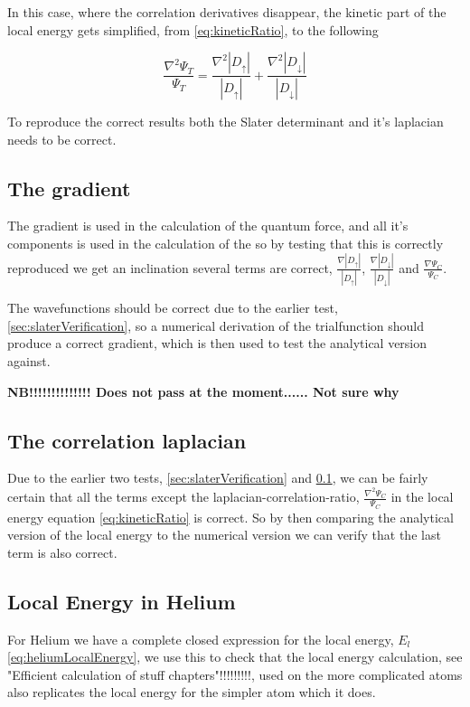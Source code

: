 			In this case, where the correlation derivatives disappear, the kinetic part of the local energy gets simplified, from \eqref{eq:kineticRatio}, to the following

			\[\frac{\nabla^2 \Psi_T}{\Psi_T} = \frac{\nabla^2 |D_\uparrow|}{|D_\uparrow|} + \frac{\nabla^2 |D_\downarrow|}{|D_\downarrow|}  \]

			To reproduce the correct results both the Slater determinant and it's laplacian needs to be correct.

		\subsection{The gradient}
			\label{sec:gradientVerification}
			The gradient is used in the calculation of the quantum force, and all it's components is used in the calculation of the so by testing that this is correctly reproduced we get an inclination several terms are correct, \(\frac{\nabla |D_\uparrow|}{|D_\uparrow|} \), \( \frac{\nabla |D_\downarrow|}{|D_\downarrow|} \) and \( \frac{\nabla \Psi_C}{\Psi_C} \).

			The wavefunctions should be correct due to the earlier test, \ref{sec:slaterVerification}, so a numerical derivation of the trialfunction should produce a correct gradient, which is then used to test the analytical version against.


			\textbf{NB!!!!!!!!!!!!!! Does not pass at the moment...... Not sure why}

		\subsection{The correlation laplacian}
			\label{sec:laplacianCorrelationVerification}

			Due to the earlier two tests, \ref{sec:slaterVerification} and \ref{sec:gradientVerification}, we can be fairly certain that all the terms except the laplacian-correlation-ratio, \(\frac{\nabla^2\Psi_C}{\Psi_C}\) in the local energy equation \eqref{eq:kineticRatio} is correct. So by then comparing the analytical version of the local energy to the numerical version we can verify that the last term is also correct.

		\subsection{Local Energy in Helium}
			For Helium we have a complete closed expression for the local energy, \(E_l\) \eqref{eq:heliumLocalEnergy}, we use this to check that the local energy calculation, see "Efficient calculation of stuff chapters"!!!!!!!!!, used on the more complicated atoms  also replicates the local energy for the simpler atom which it does. 


